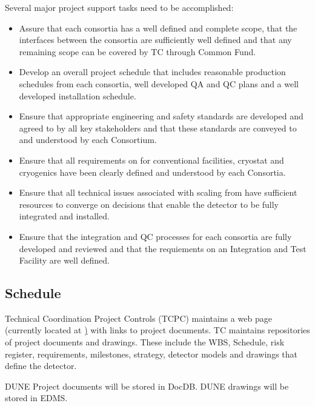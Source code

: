 Several major project support tasks need to be accomplished:
\begin{itemize}
  \item Assure that each consortia has a well defined
and complete scope, that the interfaces between the consortia are
sufficiently well defined and that any remaining scope can be covered
by TC through Common Fund.
  \item Develop an overall project schedule that includes reasonable
production schedules from each consortia, well developed QA and QC
plans and a well developed installation schedule.
  \item Ensure that appropriate engineering and safety standards are
developed and agreed to by all key stakeholders and that these
standards are conveyed to and understood by each Consortium.
  \item Ensure that all  requirements on  for
conventional facilities, cryostat and cryogenics have been clearly
defined and understood by each Consortia.
  \item Ensure that all technical issues associated with scaling from
 have sufficient resources to converge on decisions that
enable the detector to be fully integrated and installed.
  \item Ensure that the integration and QC processes for each
consortia are fully developed and reviewed and that the requiements on
an Integration and Test Facility are well defined.
\end{itemize}

\subsection{Schedule}
\label{sec:fdsp-coord-controls}

Technical Coordination Project Controls (TCPC) maintains a web page
(currently located at
\href{https://web.fnal.gov/collaboration/DUNE/DUNE\%20Project/\_layouts/15/start.aspx\#/})
with links to project documents. TC maintains repositories of project
documents and drawings. These include the WBS, Schedule, risk
register, requirements, milestones, strategy, detector models and
drawings that define the  detector.

DUNE Project documents will be stored in DocDB. DUNE drawings will be stored in EDMS.

